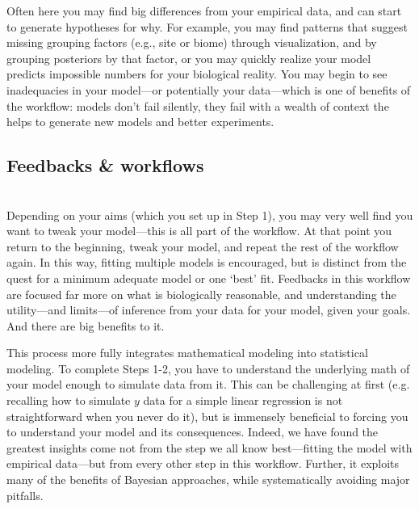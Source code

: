 \documentclass[11pt]{article}
\begin{document}
Often here you may find big differences from your empirical data, and can start to generate hypotheses for why. For example, you may find patterns that suggest missing grouping factors (e.g., site or biome) through visualization, and by grouping posteriors by that factor, or you may quickly realize your model predicts impossible numbers for your biological reality. You may begin to see inadequacies in your model---or potentially your data---which is one of benefits of the workflow: models don't fail silently, they fail with a wealth of context the helps to generate new models and better experiments.

\subsection*{Feedbacks \& workflows}\\
Depending on your aims (which you set up in Step 1), you may very well find you want to tweak your model---this is all part of the workflow. At that point you return to the beginning, tweak your model, and repeat the rest of the workflow again. In this way, fitting multiple models is encouraged, but is distinct from the quest for a minimum adequate model or one `best' fit. Feedbacks in this workflow are focused far more on what is biologically reasonable, and understanding the utility---and limits---of inference from your data for your model, given your goals.  And there are big benefits to it. 

This process more fully integrates mathematical modeling into statistical modeling. To complete Steps 1-2, you have to understand the underlying math of your model enough to simulate data from it. This can be challenging at first (e.g. recalling how to simulate $y$ data for a simple linear regression is not straightforward when you never do it), but is immensely beneficial to forcing you to understand your model and its consequences. Indeed, we have found the greatest insights come not from the step we all know best---fitting the model with empirical data---but from every other step in this workflow. Further, it exploits many of the benefits of Bayesian approaches, while systematically avoiding major pitfalls. 
\end{document}
